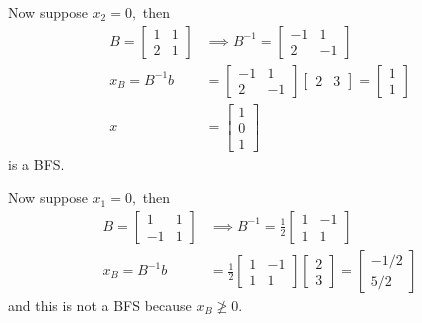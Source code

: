 \documentclass{article}
\begin{document}
\begin{enumerate}
\begin{enumerate}[a)]
\begin{soln}
					Now suppose $x_2=0,$ then 
					\begin{align*}
						B=\begin{bmatrix}
							1 & 1 \\
							2 & 1
						\end{bmatrix}&\implies B^{-1} =\begin{bmatrix}
							-1 & 1 \\
							2 & -1
					\end{bmatrix} \\
						x_B=B^{-1} b&=\begin{bmatrix}
							-1 & 1 \\
							2 & -1
						\end{bmatrix}\begin{bmatrix}
							2 & 3
						\end{bmatrix}=\begin{bmatrix}
							1 \\ 1
					\end{bmatrix} \\
						x&=\begin{bmatrix}
							1 \\ 0 \\ 1
					\end{bmatrix}
					\end{align*} is a BFS.

					Now suppose $x_1=0,$ then
					\begin{align*}
						B=\begin{bmatrix}
							1 & 1 \\
							-1 & 1
						\end{bmatrix}&\implies B^{-1} = \frac{1}{2}\begin{bmatrix}
							1 & -1 \\
							1 & 1
					\end{bmatrix} \\
						x_B=B^{-1}b&=\frac{1}{2}\begin{bmatrix}
							1 & -1 \\
							1 & 1
						\end{bmatrix}\begin{bmatrix}
							2 \\ 3
						\end{bmatrix} = \begin{bmatrix}
							-1/2 \\ 5/2
					\end{bmatrix}
					\end{align*} and this is not a BFS because $x_B\not\ge0.$


\end{soln}
\end{enumerate}
\end{enumerate}
\end{document}
